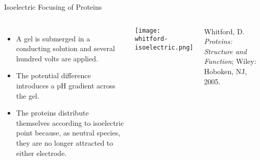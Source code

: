 \documentclass[notes=show]{beamer}
\begin{document}


\begin{frame}[allowframebreaks]{Isoelectric Focusing of Proteins}
	\begin{columns}
		\begin{itemize}
			\item A gel is submerged in a conducting solution and
				several hundred volts are applied.
			\item The potential difference introduces a pH gradient
				across the gel.
			\item The proteins distribute themselves according to
				isoelectric point because, as neutral species,
				they are no longer attracted to either
				electrode.
		\end{itemize}
		\begin{center}
		\texttt{[image: whitford-isoelectric.png]}
	\end{center}

		\bigskip

		{\footnotesize Whitford, D. \textit{Proteins: Structure and
		Function}; Wiley: Hoboken, NJ, 2005.}

	\end{columns}

	\framebreak

\end{frame}
\end{document}
